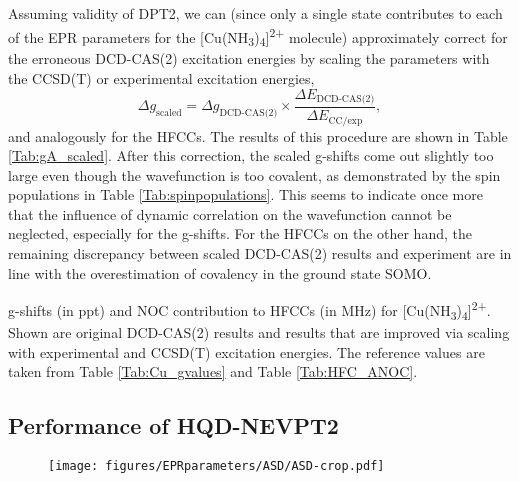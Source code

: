 Assuming validity of DPT2, we can (since only a single state contributes to each of the EPR parameters for the [Cu(NH\textsubscript{3})\textsubscript{4}]\textsuperscript{2+} molecule) approximately correct for the erroneous DCD-CAS(2) excitation energies by scaling the parameters with the CCSD(T) or experimental excitation energies,
	\begin{equation}
	\Delta {g_{{\text{scaled}}}} = \Delta {g_{{\text{DCD-CAS(2)}}}} \times \frac{{\Delta {E_{{\text{DCD-CAS(2)}}}}}}{{\Delta {E_{{\text{CC/exp}}}}}},
	\end{equation}
and analogously for the HFCCs. The results of this procedure are shown in Table \ref{Tab:gA_scaled}. After this correction, the scaled g-shifts come out slightly too large even though the wavefunction is too covalent, as demonstrated by the spin populations in Table \ref{Tab:spinpopulations}. This seems to indicate once more that the influence of dynamic correlation on the wavefunction cannot be neglected, especially for the g-shifts. For the HFCCs on the other hand, the remaining discrepancy between scaled DCD-CAS(2) results and experiment are in line with the overestimation of covalency in the ground state SOMO.
\begin{table}
\small
\centering
\caption[g-shifts and NOC contribution to HFCCs for {[Cu(NH\textsubscript{3})\textsubscript{4}]}\textsuperscript{2+}.]{g-shifts (in ppt) and NOC contribution to HFCCs (in MHz) for [Cu(NH\textsubscript{3})\textsubscript{4}]\textsuperscript{2+}. Shown are original DCD-CAS(2) results and results that are improved via scaling with experimental and CCSD(T) excitation energies. The reference values are taken from Table \ref{Tab:Cu_gvalues} and Table \ref{Tab:HFC_ANOC}.}
\label{Tab:gA_scaled}

\end{table}

\subsection{Performance of HQD-NEVPT2}
\begin{figure}
\centering
{}
{\texttt{[image: figures/EPRparameters/ASD/ASD-crop.pdf]}}
\end{figure}

